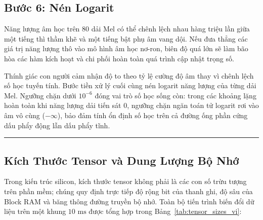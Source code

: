 \documentclass[11pt,a4paper]{article}
\begin{document}
\clearpage


\subsection*{Bước 6: Nén Logarit}

Năng lượng âm học trên 80 dải Mel có thể chênh lệch nhau hàng triệu lần giữa một tiếng thì thầm khẽ và một tiếng bật phụ âm vang dội. Nếu đưa thẳng các giá trị năng lượng thô vào mô hình âm học nơ-ron, biên độ quá lớn sẽ làm bão hòa các hàm kích hoạt và chi phối hoàn toàn quá trình cập nhật trọng số.

Thính giác con người cảm nhận độ to theo tỷ lệ cường độ âm thay vì chênh lệch số học tuyến tính. Bước tiền xử lý cuối cùng nén logarit năng lượng của từng dải Mel. Ngưỡng chặn dưới $10^{-6}$ đóng vai trò số học sống còn: trong các khoảng lặng hoàn toàn khi năng lượng dải tiến sát 0, ngưỡng chặn ngăn toán tử logarit rơi vào âm vô cùng ($-\infty$), bảo đảm tính ổn định số học trên cả đường ống phần cứng dấu phẩy động lẫn dấu phẩy tĩnh.

\smallskip
\hrule
\smallskip

\subsection*{Kích Thước Tensor và Dung Lượng Bộ Nhớ}

Trong kiến trúc silicon, kích thước tensor không phải là các con số trừu tượng trên phần mềm; chúng quy định trực tiếp độ rộng bit của thanh ghi, độ sâu của Block RAM và băng thông đường truyền bộ nhớ. Toàn bộ tiến trình biến đổi dữ liệu trên một khung $10\text{ ms}$ được tổng hợp trong Bảng~\ref{tab:tensor_sizes_vi}:
\end{document}
